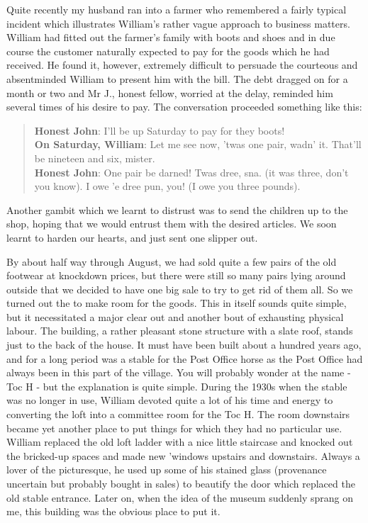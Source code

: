 Quite recently my husband ran into a farmer who remembered a fairly typical incident which illustrates William’s rather vague approach to business matters. William had fitted out the farmer's family with boots and shoes and in due course the customer naturally expected to pay for the goods which he had received. He found it, however, extremely difficult to persuade the courteous and absentminded William to present him with the bill. The debt dragged on for a month or two and Mr J., honest fellow, worried at the delay, reminded him several times of his desire to pay. The conversation proceeded something like this:

\begin{quote}
\textbf{Honest John}: I'll be up Saturday to pay for they boots! \\
\textbf{On Saturday, William}: Let me see now, 'twas one pair, wadn' it. That'll be nineteen and six, mister. \\
\textbf{Honest John}: One pair be darned! Twas dree, sna. (it was three, don’t you know). I owe 'e dree pun, you! (I owe you three pounds).
\end{quote}

Another gambit which we learnt to distrust was to send the children up to the shop, hoping that we would entrust them with the desired articles.  We soon learnt to harden our hearts, and just sent one slipper out.

By about half way through August, we had sold quite a few pairs of the old footwear at knockdown prices, but there were still so many pairs lying around outside that we decided to have one big sale to try to get rid of them all. So we turned out the  to make room for the goods. This in itself sounds quite simple, but it necessitated a major clear out and another bout of exhausting physical labour. The building, a rather pleasant stone structure with a slate roof, stands just to the back of the house. It must have been built about a hundred years ago, and for a long period was a stable for the Post Office horse as the Post Office had always been in this part of the village. You will probably wonder at the name - Toc H - but the explanation is quite simple. During the 1930s when the stable was no longer in use, William devoted quite a lot of his time and energy to converting the loft into a committee room for the Toc H. The room downstairs became yet another place to put things for which they had no particular use. William replaced the old loft ladder with a nice little staircase and knocked out the bricked-up spaces and made new 'windows upstairs and downstairs. Always a lover of the picturesque, he used up some of his stained glass (provenance uncertain but probably bought in sales) to beautify the door which replaced the old stable entrance. Later on, when the idea of the museum suddenly sprang on me, this building was the obvious place to put it.

